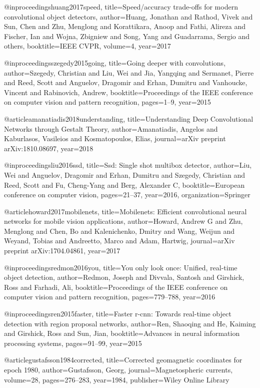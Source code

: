 @inproceedings{huang2017speed,
  title={Speed/accuracy trade-offs for modern convolutional object detectors},
  author={Huang, Jonathan and Rathod, Vivek and Sun, Chen and Zhu, Menglong and Korattikara, Anoop and Fathi, Alireza and Fischer, Ian and Wojna, Zbigniew and Song, Yang and Guadarrama, Sergio and others},
  booktitle={IEEE CVPR},
  volume={4},
  year={2017}
}

@inproceedings{szegedy2015going,
  title={Going deeper with convolutions},
  author={Szegedy, Christian and Liu, Wei and Jia, Yangqing and Sermanet, Pierre and Reed, Scott and Anguelov, Dragomir and Erhan, Dumitru and Vanhoucke, Vincent and Rabinovich, Andrew},
  booktitle={Proceedings of the IEEE conference on computer vision and pattern recognition},
  pages={1--9},
  year={2015}
}

@article{amanatiadis2018understanding,
  title={Understanding Deep Convolutional Networks through Gestalt Theory},
  author={Amanatiadis, Angelos and Kaburlasos, Vasileios and Kosmatopoulos, Elias},
  journal={arXiv preprint arXiv:1810.08697},
  year={2018}
}

@inproceedings{liu2016ssd,
  title={Ssd: Single shot multibox detector},
  author={Liu, Wei and Anguelov, Dragomir and Erhan, Dumitru and Szegedy, Christian and Reed, Scott and Fu, Cheng-Yang and Berg, Alexander C},
  booktitle={European conference on computer vision},
  pages={21--37},
  year={2016},
  organization={Springer}
}

@article{howard2017mobilenets,
  title={Mobilenets: Efficient convolutional neural networks for mobile vision applications},
  author={Howard, Andrew G and Zhu, Menglong and Chen, Bo and Kalenichenko, Dmitry and Wang, Weijun and Weyand, Tobias and Andreetto, Marco and Adam, Hartwig},
  journal={arXiv preprint arXiv:1704.04861},
  year={2017}
}

@inproceedings{redmon2016you,
  title={You only look once: Unified, real-time object detection},
  author={Redmon, Joseph and Divvala, Santosh and Girshick, Ross and Farhadi, Ali},
  booktitle={Proceedings of the IEEE conference on computer vision and pattern recognition},
  pages={779--788},
  year={2016}
}

@inproceedings{ren2015faster,
  title={Faster r-cnn: Towards real-time object detection with region proposal networks},
  author={Ren, Shaoqing and He, Kaiming and Girshick, Ross and Sun, Jian},
  booktitle={Advances in neural information processing systems},
  pages={91--99},
  year={2015}
}

@article{gustafsson1984corrected,
  title={Corrected geomagnetic coordinates for epoch 1980},
  author={Gustafsson, Georg},
  journal={Magnetospheric currents},
  volume={28},
  pages={276--283},
  year={1984},
  publisher={Wiley Online Library}
}

